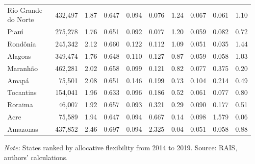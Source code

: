 {\begin{threeparttable}
\begin{tabular}{lrrrrrrrrr}
Rio Grande do Norte & 432,497 & 1.87 & 0.647 & 0.094 & 0.076 & 1.24 & 0.067 & 0.061 & 1.10 \\
Piauí & 275,278 & 1.76 & 0.651 & 0.092 & 0.077 & 1.20 & 0.059 & 0.082 & 0.72 \\
Rondônia & 245,342 & 2.12 & 0.660 & 0.122 & 0.112 & 1.09 & 0.051 & 0.035 & 1.44 \\
Alagoas & 349,474 & 1.76 & 0.648 & 0.110 & 0.127 & 0.87 & 0.059 & 0.058 & 1.03 \\
Maranhão & 462,281 & 2.02 & 0.658 & 0.099 & 0.121 & 0.82 & 0.077 & 0.375 & 0.20 \\
Amapá & 75,501 & 2.08 & 0.651 & 0.146 & 0.199 & 0.73 & 0.104 & 0.214 & 0.49 \\
Tocantins & 154,041 & 1.96 & 0.633 & 0.096 & 0.186 & 0.52 & 0.061 & 0.077 & 0.80 \\
Roraima & 46,007 & 1.92 & 0.657 & 0.093 & 0.321 & 0.29 & 0.090 & 0.177 & 0.51 \\
Acre & 75,589 & 1.94 & 0.647 & 0.094 & 0.667 & 0.14 & 0.098 & 1.579 & 0.06 \\
Amazonas & 437,852 & 2.46 & 0.697 & 0.094 & 2.325 & 0.04 & 0.051 & 0.058 & 0.88 \\
\bottomrule
\end{tabular}
\begin{tablenotes}[flushleft]\footnotesize
\item \textit{Note:} States ranked by allocative flexibility from 2014 to 2019. Source: RAIS, authors' calculations.
\end{tablenotes}
\end{threeparttable}
}
